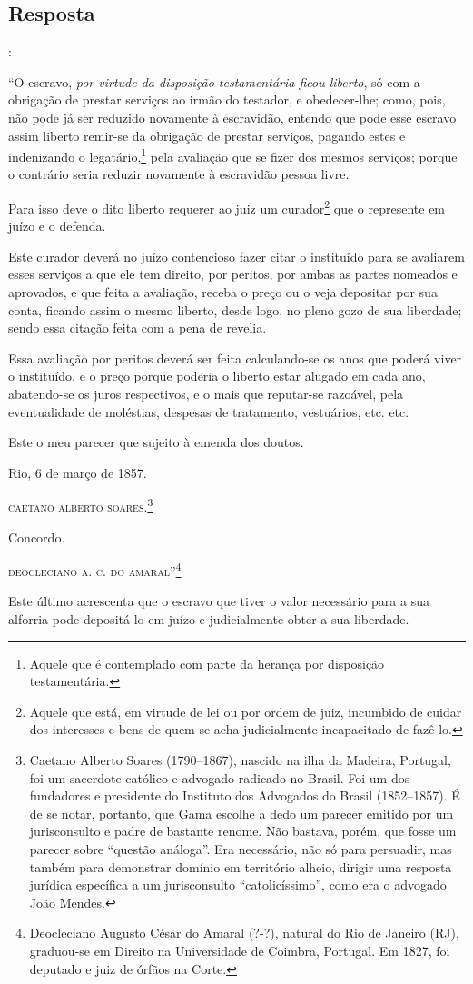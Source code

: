{\subsection{Resposta}:

``O escravo, \emph{por virtude da disposição testamentária ficou
liberto}, só com a obrigação de prestar serviços ao irmão do testador, e
obedecer-lhe; como, pois, não pode já ser reduzido novamente à
escravidão, entendo que pode esse escravo assim liberto remir-se da
obrigação de prestar serviços, pagando estes e indenizando o
legatário\textsuperscript{⁠},\footnote{ Aquele que é contemplado com
  parte da herança por disposição testamentária.} pela avaliação que se
fizer dos mesmos serviços; porque o contrário seria reduzir novamente à
escravidão pessoa livre.

Para isso deve o dito liberto requerer ao juiz um curador\footnote{
  Aquele que está, em virtude de lei ou por ordem de juiz, incumbido de
  cuidar dos interesses e bens de quem se acha judicialmente
  incapacitado de fazê-lo.} que o represente em juízo e o defenda.

Este curador deverá no juízo contencioso fazer citar o instituído para
se avaliarem esses serviços a que ele tem direito, por peritos, por
ambas as partes nomeados e aprovados, e que feita a avaliação, receba o
preço ou o veja depositar por sua conta, ficando assim o mesmo liberto,
desde logo, no pleno gozo de sua liberdade; sendo essa citação feita com
a pena de revelia.

Essa avaliação por peritos deverá ser feita calculando-se os anos que
poderá viver o instituído, e o preço porque poderia o liberto estar
alugado em cada ano, abatendo-se os juros respectivos, e o mais que
reputar-se razoável, pela eventualidade de moléstias, despesas de
tratamento, vestuários, etc. etc.

Este o meu parecer que sujeito à emenda dos doutos.
\begin{flushright}
Rio, 6 de março de 1857.

\textsc{caetano alberto soares}.\footnote{ Caetano Alberto Soares
  (1790--1867), nascido na ilha da Madeira, Portugal, foi um sacerdote
  católico e advogado radicado no Brasil. Foi um dos fundadores e
  presidente do Instituto dos Advogados do Brasil (1852--1857). É de se
  notar, portanto, que Gama escolhe a dedo um parecer emitido por um
  jurisconsulto e padre de bastante renome. Não bastava, porém, que
  fosse um parecer sobre ``questão análoga''. Era necessário, não só
  para persuadir, mas também para demonstrar domínio em território
  alheio, dirigir uma resposta jurídica específica a um jurisconsulto
  ``catolicíssimo'', como era o advogado João Mendes.}
\end{flushright}
Concordo.
\begin{flushright}
\textsc{deocleciano a. c. do amaral}''\footnote{ Deocleciano Augusto César do
  Amaral (?-?), natural do Rio de Janeiro (RJ), graduou-se em Direito na
  Universidade de Coimbra, Portugal. Em 1827, foi deputado e juiz de
  órfãos na Corte.}
\end{flushright}
Este último acrescenta que o escravo que tiver o valor necessário para a
sua alforria pode depositá-lo em juízo e judicialmente obter a sua
liberdade.

}

